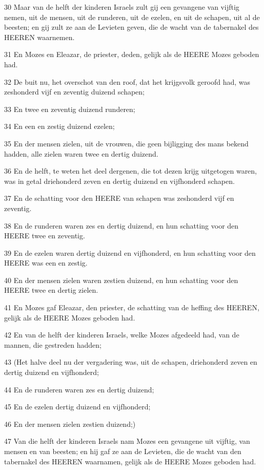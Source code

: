 \par 30 Maar van de helft der kinderen Israels zult gij een gevangene van vijftig nemen, uit de mensen, uit de runderen, uit de ezelen, en uit de schapen, uit al de beesten; en gij zult ze aan de Levieten geven, die de wacht van de tabernakel des HEEREN waarnemen.
\par 31 En Mozes en Eleazar, de priester, deden, gelijk als de HEERE Mozes geboden had.
\par 32 De buit nu, het overschot van den roof, dat het krijgsvolk geroofd had, was zeshonderd vijf en zeventig duizend schapen;
\par 33 En twee en zeventig duizend runderen;
\par 34 En een en zestig duizend ezelen;
\par 35 En der mensen zielen, uit de vrouwen, die geen bijligging des mans bekend hadden, alle zielen waren twee en dertig duizend.
\par 36 En de helft, te weten het deel dergenen, die tot dezen krijg uitgetogen waren, was in getal driehonderd zeven en dertig duizend en vijfhonderd schapen.
\par 37 En de schatting voor den HEERE van schapen was zeshonderd vijf en zeventig.
\par 38 En de runderen waren zes en dertig duizend, en hun schatting voor den HEERE twee en zeventig.
\par 39 En de ezelen waren dertig duizend en vijfhonderd, en hun schatting voor den HEERE was een en zestig.
\par 40 En der mensen zielen waren zestien duizend, en hun schatting voor den HEERE twee en dertig zielen.
\par 41 En Mozes gaf Eleazar, den priester, de schatting van de heffing des HEEREN, gelijk als de HEERE Mozes geboden had.
\par 42 En van de helft der kinderen Israels, welke Mozes afgedeeld had, van de mannen, die gestreden hadden;
\par 43 (Het halve deel nu der vergadering was, uit de schapen, driehonderd zeven en dertig duizend en vijfhonderd;
\par 44 En de runderen waren zes en dertig duizend;
\par 45 En de ezelen dertig duizend en vijfhonderd;
\par 46 En der mensen zielen zestien duizend;)
\par 47 Van die helft der kinderen Israels nam Mozes een gevangene uit vijftig, van mensen en van beesten; en hij gaf ze aan de Levieten, die de wacht van den tabernakel des HEEREN waarnamen, gelijk als de HEERE Mozes geboden had.
